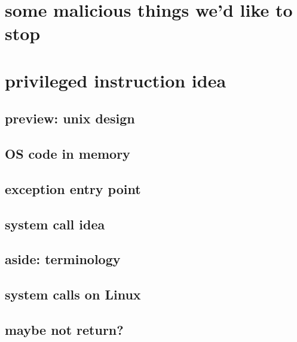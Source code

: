 \section{some malicious things we'd like to stop}



\section{privileged instruction idea}


\subsection{preview: unix design}


\subsection{OS code in memory}


\subsection{exception entry point}


\subsection{system call idea}


\subsection{aside: terminology}


\subsection{system calls on Linux}


\subsection{maybe not return?}



